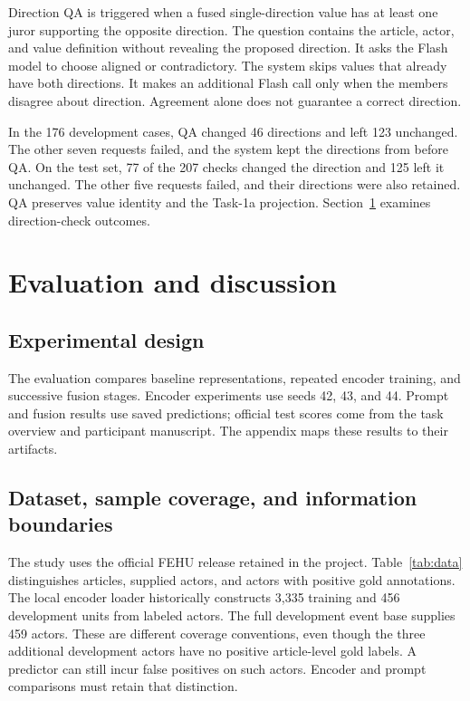 \documentclass[12pt,a4paper]{article}
\begin{document}
Direction QA is triggered when a fused single-direction value has at least one juror supporting the opposite direction. The question contains the article, actor, and value definition without revealing the proposed direction. It asks the Flash model to choose aligned or contradictory. The system skips values that already have both directions. It makes an additional Flash call only when the members disagree about direction. Agreement alone does not guarantee a correct direction.

In the 176 development cases, QA changed 46 directions and left 123 unchanged. The other seven requests failed, and the system kept the directions from before QA. On the test set, 77 of the 207 checks changed the direction and 125 left it unchanged. The other five requests failed, and their directions were also retained. QA preserves value identity and the Task-1a projection. Section~\ref{sec:eval} examines direction-check outcomes.

\clearpage
\section{Evaluation and discussion}\label{sec:eval}
\subsection{Experimental design}
The evaluation compares baseline representations, repeated encoder training, and successive fusion stages. Encoder experiments use seeds 42, 43, and 44. Prompt and fusion results use saved predictions; official test scores come from the task overview and participant manuscript. The appendix maps these results to their artifacts.


\subsection{Dataset, sample coverage, and information boundaries}
The study uses the official FEHU release retained in the project. Table~\ref{tab:data} distinguishes articles, supplied actors, and actors with positive gold annotations. The local encoder loader historically constructs 3,335 training and 456 development units from labeled actors. The full development event base supplies 459 actors. These are different coverage conventions, even though the three additional development actors have no positive article-level gold labels. A predictor can still incur false positives on such actors. Encoder and prompt comparisons must retain that distinction.
\end{document}
